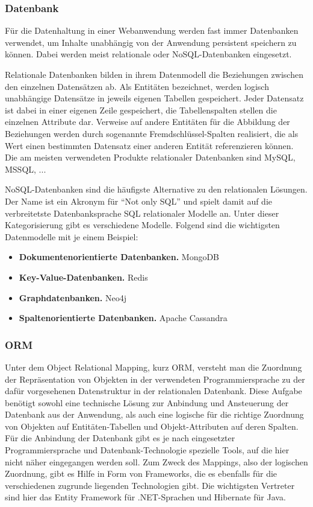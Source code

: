 \subsubsection{Datenbank}
Für die Datenhaltung in einer Webanwendung werden fast immer Datenbanken verwendet, um Inhalte unabhängig von der Anwendung persistent speichern zu können.
Dabei werden meist relationale oder \acs{NoSQL}-Datenbanken eingesetzt.

Relationale Datenbanken bilden in ihrem Datenmodell die Beziehungen zwischen den einzelnen Datensätzen ab.
Als Entitäten bezeichnet, werden logisch unabhängige Datensätze in jeweils eigenen Tabellen gespeichert. Jeder Datensatz ist dabei in einer eigenen Zeile gespeichert, die Tabellenspalten stellen die einzelnen Attribute dar.
Verweise auf andere Entitäten für die Abbildung der Beziehungen werden durch sogenannte Fremdschlüssel-Spalten realisiert, die als Wert einen bestimmten Datensatz einer anderen Entität referenzieren können.
Die am meisten verwendeten Produkte relationaler Datenbanken sind MySQL, MSSQL, ...%

\acs{NoSQL}-Datenbanken sind die häufigste Alternative zu den relationalen Lösungen. Der Name ist ein Akronym für \enquote{Not only SQL} und spielt damit auf die verbreitetste Datenbanksprache \acs{SQL} relationaler Modelle an.
Unter dieser Kategorisierung gibt es verschiedene Modelle. Folgend sind die wichtigsten Datenmodelle mit je einem Beispiel:

\begin{itemize}
\item\textbf{Dokumentenorientierte Datenbanken.} MongoDB
\item\textbf{Key-Value-Datenbanken.} Redis
\item\textbf{Graphdatenbanken.} Neo4j
\item\textbf{Spaltenorientierte Datenbanken.} Apache Cassandra
\end{itemize}

\subsubsection{ORM}
Unter dem Object Relational Mapping, kurz \acs{ORM}, versteht man die Zuordnung der Repräsentation von Objekten in der verwendeten Programmiersprache zu der dafür vorgesehenen Datenstruktur in der relationalen Datenbank.
Diese Aufgabe benötigt sowohl eine technische Lösung zur Anbindung und Ansteuerung der Datenbank aus der Anwendung, als auch eine logische für die richtige Zuordnung von Objekten auf Entitäten-Tabellen und Objekt-Attributen auf deren Spalten.
Für die Anbindung der Datenbank gibt es je nach eingesetzter Programmiersprache und Datenbank-Technologie spezielle Tools, auf die hier nicht näher eingegangen werden soll.
Zum Zweck des Mappings, also der logischen Zuordnung, gibt es Hilfe in Form von Frameworks, die es ebenfalls für die verschiedenen zugrunde liegenden Technologien gibt.
Die wichtigsten Vertreter sind hier das Entity Framework für .NET-Sprachen und Hibernate für Java.

